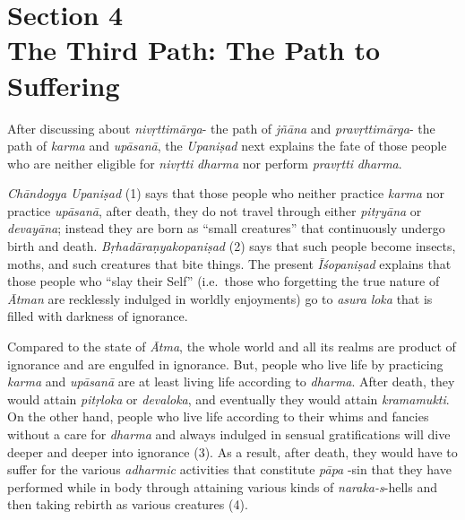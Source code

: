 \chapter[Section 4 The Third Path: The Path to Suffering]{Section 4\\ The Third Path: The Path to Suffering}

After discussing about \emph{nivṛttimārga}- the path of \emph{jñāna} and \emph{pravṛttimārga}- the path of \emph{karma} and \emph{upāsanā}, the \emph{Upaniṣad} next explains the fate of those people who are neither eligible for \emph{nivṛtti} \emph{dharma} nor perform \emph{pravṛtti} \emph{dharma}.

\emph{Chāndogya} \emph{Upaniṣad} (1) says that those people who neither practice \emph{karma} nor practice \emph{upāsanā}, after death, they do not travel through either \emph{pitṛyāna} or \emph{devayāna}; instead they are born as ``small creatures'' that continuously undergo birth and death. \emph{Bṛhadāraṇyakopaniṣad} (2) says that such people become insects, moths, and such creatures that bite things. The present \emph{Īśopaniṣad} explains that those people who ``slay their Self'' (i.e.\ those who forgetting the true nature of \emph{Ātman} are recklessly indulged in worldly enjoyments) go to \emph{asura} \emph{loka} that is filled with darkness of ignorance.

Compared to the state of \emph{Ātma}, the whole world and all its realms are product of ignorance and are engulfed in ignorance. But, people who live life by practicing \emph{karma} and \emph{upāsanā} are at least living life according to \emph{dharma}. After death, they would attain \emph{pitṛloka} or \emph{devaloka}, and eventually they would attain \emph{kramamukti}. On the other hand, people who live life according to their whims and fancies without a care for \emph{dharma} and always indulged in sensual gratifications will dive deeper and deeper into ignorance (3). As a result, after death, they would have to suffer for the various \emph{adharmic} activities that constitute \emph{pāpa} -sin that they have performed while in body through attaining various kinds of \emph{naraka-s}-hells and then taking rebirth as various creatures (4).

